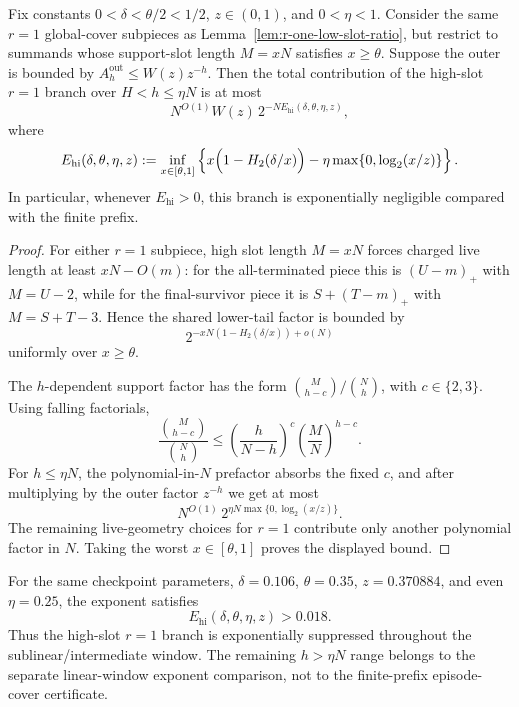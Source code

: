 \begin{lemma}[High-slot \(r=1\) suppression below the linear splice]
\label{lem:r-one-high-slot-suppression}
Fix constants \(0<\delta<\theta/2<1/2\), \(z\in(0,1)\), and \(0<\eta<1\).  Consider the same \(r=1\) global-cover
subpieces as Lemma~\ref{lem:r-one-low-slot-ratio}, but restrict to summands whose support-slot length \(M=xN\)
satisfies \(x\ge\theta\).  Suppose the outer is bounded by \(A_h^{\mathrm{out}}\le W(z)z^{-h}\).  Then the total
contribution of the high-slot \(r=1\) branch over \(H<h\le\eta N\) is at most
\[
N^{O(1)}W(z)\,
2^{-N E_{\mathrm{hi}}(\delta,\theta,\eta,z)},
\]
where
\[
E_{\mathrm{hi}}(\delta,\theta,\eta,z)
:=
\inf_{x\in[\theta,1]}
\left\{
x\Bigl(1-H_2(\delta/x)\Bigr)
-
\eta\max\{0,\log_2(x/z)\}
\right\}.
\]
In particular, whenever \(E_{\mathrm{hi}}>0\), this branch is exponentially negligible compared with the finite
prefix.
\end{lemma}

\begin{proof}
For either \(r=1\) subpiece, high slot length \(M=xN\) forces charged live length at least \(xN-O(m)\): for the
all-terminated piece this is \((U-m)_+\) with \(M=U-2\), while for the final-survivor piece it is
\(S+(T-m)_+\) with \(M=S+T-3\).  Hence the shared lower-tail factor is bounded by
\[
2^{-xN(1-H_2(\delta/x))+o(N)}
\]
uniformly over \(x\ge\theta\).

The \(h\)-dependent support factor has the form
\(\binom{M}{h-c}/\binom{N}{h}\), with \(c\in\{2,3\}\).  Using falling factorials,
\[
\frac{\binom{M}{h-c}}{\binom{N}{h}}
\le
\left(\frac{h}{N-h}\right)^c
\left(\frac{M}{N}\right)^{h-c}.
\]
For \(h\le\eta N\), the polynomial-in-\(N\) prefactor absorbs the fixed \(c\), and after multiplying by the outer
factor \(z^{-h}\) we get at most
\[
N^{O(1)}\,
2^{\eta N\max\{0,\log_2(x/z)\}}.
\]
The remaining live-geometry choices for \(r=1\) contribute only another polynomial factor in \(N\).  Taking the worst
\(x\in[\theta,1]\) proves the displayed bound.
\end{proof}

For the same checkpoint parameters, \(\delta=0.106\), \(\theta=0.35\), \(z=0.370884\), and even \(\eta=0.25\), the
exponent satisfies
\[
E_{\mathrm{hi}}(\delta,\theta,\eta,z)>0.018.
\]
Thus the high-slot \(r=1\) branch is exponentially suppressed throughout the sublinear/intermediate window.  The
remaining \(h>\eta N\) range belongs to the separate linear-window exponent comparison, not to the finite-prefix
episode-cover certificate.

